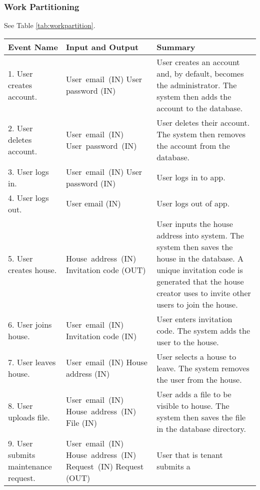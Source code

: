 \documentclass[12pt]{article}
\begin{document}
\subsubsection{Work Partitioning} 
See Table \ref{tab:workpartition}.
\begin{longtable}{|p{5cm}|p{5cm}|p{5cm}|}
\hline
\textbf{Event Name}  & \textbf{Input and Output} & \textbf{Summary} \\ 
\hline
1. User creates account. & \mbox{User email (IN)} \linebreak User password (IN) & User creates 
an account and, by default, becomes the administrator. The system then adds the account to the database. \\ 
\hline
2. User deletes account. & \mbox{User email (IN)} \linebreak \mbox{User password 
(IN)} & User deletes their account. The system then removes the account from the 
database. \\ 
\hline
3. User logs in. & \mbox{User email (IN)} \linebreak User password (IN) & User logs 
in to app. \\ 
\hline
4. User logs out. & User email (IN) & User logs out of app. \\
\hline
5. User creates house. & \mbox{House address (IN)} \linebreak Invitation code (OUT) & User 
inputs the house address into system. The system then saves the house in the 
database. A unique invitation code is generated that the house creator uses to invite other users to join the house. \\
\hline
6. User joins house. & \mbox{User email (IN)} \linebreak Invitation code (IN) & User 
enters invitation code. The system adds the user to the house. \\
\hline
7. User leaves house. & \mbox{User email (IN)} \linebreak House address (IN) & User 
selects a house to leave. The system removes the user from the house. \\
\hline
8. User uploads file. & \mbox{User email (IN)} \linebreak \mbox{House address (IN)} \linebreak File (IN) & User adds a 
file to be visible to house. The system then saves the file in the database 
directory. \\
\hline
9. User submits maintenance request. & \mbox{User email (IN)} \linebreak \mbox{House address (IN)} \linebreak \mbox{Request (IN)} \linebreak Request (OUT) & User that is tenant submits a 

\end{longtable}
\end{document}

